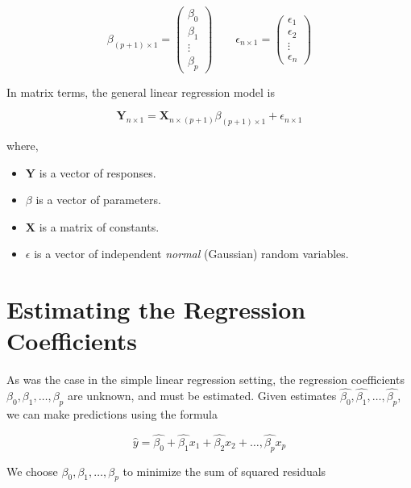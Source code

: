 \documentclass[]{book}
\providecommand{\tightlist}{%
  \setlength{\itemsep}{0pt}\setlength{\parskip}{0pt}}
\begin{document}
\begin{equation}
 {\mathbb{\beta}}_{(p+1) \times 1} = \begin{pmatrix}
    \beta_{0} \\
    \beta_{1} \\
    \vdots \\
    \beta_{p}
    \end{pmatrix}   \,\,\,\,\,\,\,\,\,\,\,\,  {\epsilon}_{n \times 1} = \begin{pmatrix}
        \epsilon_{1} \\
        \epsilon_{2} \\
        \vdots \\
        \epsilon_{n}
    \end{pmatrix}
\end{equation}

In matrix terms, the general linear regression model is

\[ \textbf{Y}_{n \times 1} = \textbf{X}_{n \times (p+1)} {\mathbb{\beta}}_{(p+1) \times 1} + {\epsilon}_{n \times 1} \]

where,

\begin{itemize}
\tightlist
\item
  \(\textbf{Y}\) is a vector of responses.
\item
  \(\mathbb{\beta}\) is a vector of parameters.
\item
  \(\textbf{X}\) is a matrix of constants.
\item
  \(\epsilon\) is a vector of independent \emph{normal} (Gaussian)
  random variables.
\end{itemize}

\section{Estimating the Regression
Coefficients}\label{estimating-the-regression-coefficients}

As was the case in the simple linear regression setting, the regression
coefficients \(\beta_{0}, \beta_{1}, \ldots, \beta_{p}\) are unknown,
and must be estimated. Given estimates
\(\hat{\beta_{0}}, \hat{\beta_{1}}, \ldots, \hat{\beta_{p}}\), we can
make predictions using the formula

\[ \hat{y} = \hat{\beta_{0}} + \hat{\beta_{1}} x_1 + \hat{\beta_{2}} x_2 + \ldots, \hat{\beta_{p}} x_p \]

We choose \(\beta_{0}, \beta_{1}, \ldots, \beta_{p}\) to minimize the
sum of squared residuals
\end{document}
